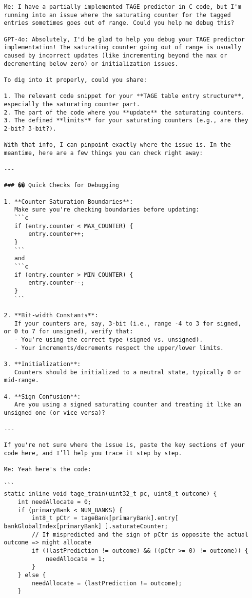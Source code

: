 \documentclass[11pt]{article}
\begin{document}
\begin{Verbatim}[fontsize=\tiny, breaklines=true]
Me: I have a partially implemented TAGE predictor in C code, but I'm running into an issue where the saturating counter for the tagged entries sometimes goes out of range. Could you help me debug this?

GPT-4o: Absolutely, I'd be glad to help you debug your TAGE predictor implementation! The saturating counter going out of range is usually caused by incorrect updates (like incrementing beyond the max or decrementing below zero) or initialization issues.

To dig into it properly, could you share:

1. The relevant code snippet for your **TAGE table entry structure**, especially the saturating counter part.
2. The part of the code where you **update** the saturating counters.
3. The defined **limits** for your saturating counters (e.g., are they 2-bit? 3-bit?).

With that info, I can pinpoint exactly where the issue is. In the meantime, here are a few things you can check right away:

---

### �� Quick Checks for Debugging

1. **Counter Saturation Boundaries**:
   Make sure you're checking boundaries before updating:
   ```c
   if (entry.counter < MAX_COUNTER) {
       entry.counter++;
   }
   ```
   and
   ```c
   if (entry.counter > MIN_COUNTER) {
       entry.counter--;
   }
   ```

2. **Bit-width Constants**:
   If your counters are, say, 3-bit (i.e., range -4 to 3 for signed, or 0 to 7 for unsigned), verify that:
   - You’re using the correct type (signed vs. unsigned).
   - Your increments/decrements respect the upper/lower limits.

3. **Initialization**:
   Counters should be initialized to a neutral state, typically 0 or mid-range.

4. **Sign Confusion**:
   Are you using a signed saturating counter and treating it like an unsigned one (or vice versa)?

---

If you're not sure where the issue is, paste the key sections of your code here, and I’ll help you trace it step by step.

Me: Yeah here's the code:

```
static inline void tage_train(uint32_t pc, uint8_t outcome) {
    int needAllocate = 0;
    if (primaryBank < NUM_BANKS) {
        int8_t pCtr = tageBank[primaryBank].entry[ bankGlobalIndex[primaryBank] ].saturateCounter;
        // If mispredicted and the sign of pCtr is opposite the actual outcome => might allocate
        if ((lastPrediction != outcome) && ((pCtr >= 0) != outcome)) {
            needAllocate = 1;
        }
    } else {
        needAllocate = (lastPrediction != outcome);
    }


\end{Verbatim}
\end{document}
